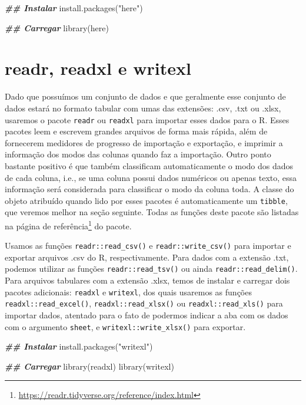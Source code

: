 \documentclass[
]{book}
\newenvironment{Shaded}{\begin{snugshade}}{\end{snugshade}}
\newcommand{\DocumentationTok}[1]{\textcolor[rgb]{0.37,0.37,0.37}{\textbf{\textit{#1}}}}
\newcommand{\FunctionTok}[1]{\textcolor[rgb]{0,0,0}{#1}}
\newcommand{\NormalTok}[1]{#1}
\newcommand{\StringTok}[1]{\textcolor[rgb]{0.5,0.5,0.5}{#1}}
\renewcommand{\href}[2]{#2\footnote{\url{#1}}}
\begin{document}
\begin{Shaded}
\begin{Highlighting}[]
\DocumentationTok{\#\# Instalar}
\FunctionTok{install.packages}\NormalTok{(}\StringTok{"here"}\NormalTok{)}

\DocumentationTok{\#\# Carregar}
\FunctionTok{library}\NormalTok{(here)}
\end{Highlighting}
\end{Shaded}

\hypertarget{readr-readxl-e-writexl}{%
\section{readr, readxl e writexl}\label{readr-readxl-e-writexl}}

Dado que possuímos um conjunto de dados e que geralmente esse conjunto de dados estará no formato tabular com umas das extensões: .csv, .txt ou .xlsx, usaremos o pacote \texttt{readr} ou \texttt{readxl} para importar esses dados para o R. Esses pacotes leem e escrevem grandes arquivos de forma mais rápida, além de fornecerem medidores de progresso de importação e exportação, e imprimir a informação dos modos das colunas quando faz a importação. Outro ponto bastante positivo é que também classificam automaticamente o modo dos dados de cada coluna, i.e., se uma coluna possui dados numéricos ou apenas texto, essa informação será considerada para classificar o modo da coluna toda. A classe do objeto atribuído quando lido por esses pacotes é automaticamente um \texttt{tibble}, que veremos melhor na seção seguinte. Todas as funções deste pacote são listadas na \href{https://readr.tidyverse.org/reference/index.html}{página de referência} do pacote.

Usamos as funções \texttt{readr::read\_csv()} e \texttt{readr::write\_csv()} para importar e exportar arquivos .csv do R, respectivamente. Para dados com a extensão .txt, podemos utilizar as funções \texttt{readr::read\_tsv()} ou ainda \texttt{readr::read\_delim()}. Para arquivos tabulares com a extensão .xlsx, temos de instalar e carregar dois pacotes adicionais: \texttt{readxl} e \texttt{writexl}, dos quais usaremos as funções \texttt{readxl::read\_excel()}, \texttt{readxl::read\_xlsx()} ou \texttt{readxl::read\_xls()} para importar dados, atentado para o fato de podermos indicar a aba com os dados com o argumento \texttt{sheet}, e \texttt{writexl::write\_xlsx()} para exportar.

\begin{Shaded}
\begin{Highlighting}[]
\DocumentationTok{\#\# Instalar}
\FunctionTok{install.packages}\NormalTok{(}\StringTok{"writexl"}\NormalTok{)}

\DocumentationTok{\#\# Carregar}
\FunctionTok{library}\NormalTok{(readxl)}
\FunctionTok{library}\NormalTok{(writexl)}
\end{Highlighting}
\end{Shaded}
\end{document}
